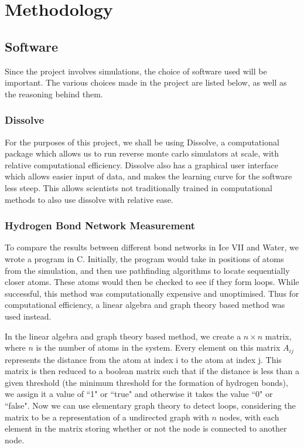 \documentclass[a4paper,11pt]{article}
\begin{document}
\section{Methodology}
\subsection{Software}
Since the project involves simulations, the choice of software used will be important. The various choices made in the project are listed below, as well as the reasoning behind them.
\subsubsection{Dissolve}
For the purposes of this project, we shall be using Dissolve, a computational package which allows us to run reverse monte carlo simulators at scale, with relative computational efficiency. Dissolve also has a graphical user interface which allows easier input of data, and makes the learning curve for the software less steep. This allows scientists not traditionally trained in computational methods to also use dissolve with relative ease.
\subsubsection{Hydrogen Bond Network Measurement}
To compare the results between different bond networks in Ice VII and Water, we wrote a program in C. Initially, the program would take in positions of atoms from the simulation, and then use pathfinding algorithms to locate sequentially closer atoms. These atoms would then be checked to see if they form loops. While successful, this method was computationally expensive and unoptimised. Thus for computational efficiency, a linear algebra and graph theory based method was used instead.

In the linear algebra and graph theory based method, we create a $n \times n$ matrix, where $n$ is the number of atoms in the system. Every element on this matrix $A_{ij}$ represents the distance from the atom at index i to the atom at index j. This matrix is then reduced to a boolean matrix such that if the distance is less than a given threshold (the minimum threshold for the formation of hydrogen bonds), we assign it a value of ``1" or ``true" and otherwise it takes the value ``0" or ``false". Now we can use elementary graph theory to detect loops, considering the matrix to be a representation of a undirected graph with $n$ nodes, with each element in the matrix storing whether or not the node is connected to another node.
\end{document}
